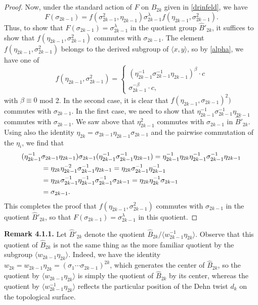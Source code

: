 \documentclass[a4paper,10pt,reqno]{amsart}
\newcommand\B{\widehat{B}}
\begin{document}
\begin{proof}
Now, under the standard action of $F$ on $\B_{2k}$ given in \eqref{drinfeld},
we have
$$F(\sigma_{2k-1})=f(\sigma_{2k-1}^2,\eta_{2k-1})\sigma_{2k-1}^\lambda
f(\eta_{2k-1},\sigma_{2k-1}^2).$$
Thus, to show that $F(\sigma_{2k-1})=\sigma_{2k-1}^\lambda$ in the 
quotient group $\B'_{2k}$, it suffices to show that
$f(\eta_{2k-1},\sigma_{2k-1}^2)$ commutes with $\sigma_{2k-1}$. The element
$f(\eta_{2k-1},\sigma_{2k-1}^2)$ belongs to the derived subgroup of
$\langle x,y\rangle$, so by \eqref{alpha}, we have one of
$$f(\eta_{2k-1},\sigma_{2k-1}^2)=\begin{cases}
(\eta_{2k-1}^{-1}\sigma_{2k-1}^{-1}\eta_{2k-1})^\beta\cdot c\\
\sigma_{2k-1}^{-\beta}\cdot c,
\end{cases}
$$
with $\beta\equiv 0$ mod 2. In the second case, it is clear that
$f(\eta_{2k-1},\sigma_{2k-1})^2)$ commutes with $\sigma_{2k-1}$. In the
first case, we need to show that $\eta_{2k-1}^{-1}\sigma_{2k-1}^{-1}\eta_{2k-1}$
commutes with $\sigma_{2k-1}$. We saw above that $\eta_{2k-1}^2$ commutes with 
$\sigma_{2k-1}$ in $\B'_{2k}$. Using also the identity
$\eta_{2k}=\sigma_{2k-1}\eta_{2k-1}\sigma_{2k-1}$ and the pairwise commutation
of the $\eta_i$, we find that
\begin{align}
(\eta_{2k-1}^{-1}&\sigma_{2k-1}\eta_{2k-1})\sigma_{2k-1}(\eta_{2k-1}^{-1}\sigma_{2k-1}^{-1}\eta_{2k-1}
)=\eta_{2k-1}^{-1}\eta_{2k}\eta_{2k-1}^{-1}\sigma_{2k-1}^{-1}\eta_{2k-1}\notag\\
&=\eta_{2k}\eta_{2k-1}^{-2}\sigma_{2k-1}^{-1}\eta_{2k-1}=\eta_{2k}\sigma_{2k-1}^{-1}
\eta_{2k-1}^{-1}\notag\\
&=\eta_{2k}\sigma_{2k-1}^{-1}\eta_{2k-1}^{-1}\sigma_{2k-1}^{-1}\sigma_{2k-1}
=\eta_{2k}\eta_{2k}^{-1}\sigma_{2k-1}\notag\\
&=\sigma_{2k-1}.\notag
\end{align}
This completes the proof that $f(\eta_{2k-1},\sigma_{2k-1}^2)$ commutes
with $\sigma_{2k-1}$ in the quotient $\B'_{2k}$, so that
$F(\sigma_{2k-1})=\sigma_{2k-1}^\lambda$ in this quotient.
\end{proof}

\vspace{.2cm}
\noindent
{\bf Remark 4.1.1.}
{\rm Let $\B'_{2k}$ denote the quotient
$\B_{2k}/\langle w_{2k-1}^{-1}\eta_{2k}\rangle$. Observe that this quotient of 
$\B_{2k}$ is not the
same thing as the more familiar quotient by the subgroup
$\langle w_{2k-1}\eta_{2k}\rangle$. Indeed, we have the identity
$w_{2k}=w_{2k-1}\eta_{2k}=(\sigma_1\cdots \sigma_{2k-1})^{2k}$,
which generates the center of $\B_{2k}$, so the quotient by
$\langle w_{2k-1}\eta_{2k}\rangle$ is simply the quotient of
$\B_{2k}$ by its center, whereas the quotient by $\langle w_{2k-1}^{-1}
\eta_{2k}\rangle$ reflects the particular position of the Dehn twist $d_k$
on the topological surface.}
\end{document}
